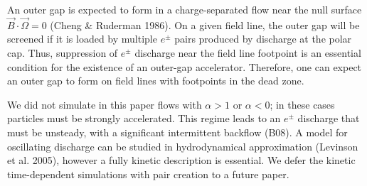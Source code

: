 An outer gap is expected to form in a charge-separated flow near the null surface
$\vec{B}\cdot\vec{\Omega}=0$ (Cheng \& Ruderman 1986).
On a given field line, the outer gap will be screened if it is loaded by multiple $e^\pm$ pairs
produced by discharge at the polar cap.
Thus, suppression of $e^\pm$ discharge near the field line footpoint is
an essential condition for the existence of an outer-gap accelerator.
Therefore, one can expect an outer gap to form on
field lines with footpoints in the dead zone.


We did not simulate in this paper flows with $\alpha>1$ or $\alpha<0$;
in these cases particles must be strongly accelerated.
This regime leads to an $e^\pm$ discharge that must be unsteady,
with a significant intermittent backflow (B08).
A model for oscillating discharge can be studied in hydrodynamical approximation
(Levinson et al. 2005), however a fully kinetic description is essential.
We defer the kinetic time-dependent simulations with pair creation
to a future paper.


